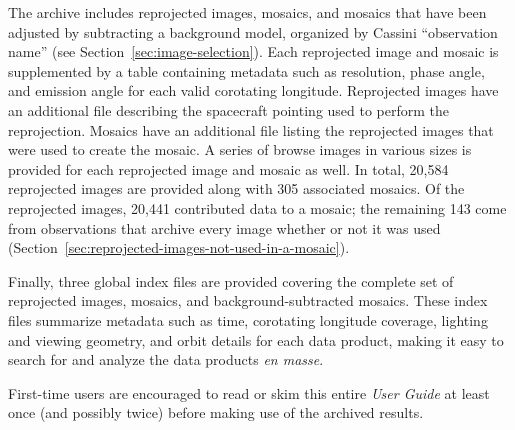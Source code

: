 The archive includes reprojected images, mosaics, and mosaics that have been adjusted by subtracting a background model, organized by Cassini “observation name” (see Section~\ref{sec:image-selection}). Each reprojected image and mosaic is supplemented by a table containing metadata such as resolution, phase angle, and emission angle for each valid corotating longitude. Reprojected images have an additional file describing the spacecraft pointing used to perform the reprojection. Mosaics have an additional file listing the reprojected images that were used to create the mosaic. A series of browse images in various sizes is provided for each reprojected image and mosaic as well. In total, 20,584 reprojected images are provided along with 305 associated mosaics. Of the reprojected images, 20,441 contributed data to a mosaic; the remaining 143 come from observations that archive every image whether or not it was used (Section~\ref{sec:reprojected-images-not-used-in-a-mosaic}).

Finally, three global index files are provided covering the complete set of reprojected images, mosaics, and background-subtracted mosaics. These index files summarize metadata such as time, corotating longitude coverage, lighting and viewing geometry, and orbit details for each data product, making it easy to search for and analyze the data products \textit{en masse}.

First-time users are encouraged to read or skim this entire \textit{User Guide} at least once (and possibly twice) before making use of the archived results.
